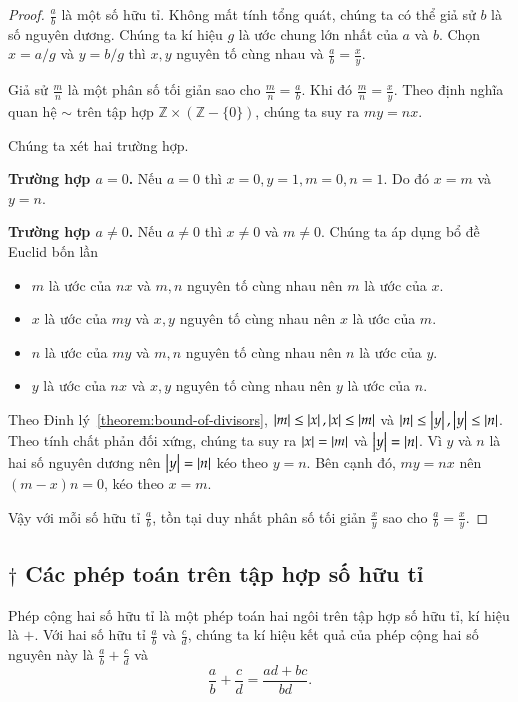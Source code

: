 \begin{proof}
	$\frac{a}{b}$ là một số hữu tỉ. Không mất tính tổng quát, chúng ta có thể giả sử $b$ là số nguyên dương. Chúng ta kí hiệu $g$ là ước chung lớn nhất của $a$ và $b$. Chọn $x = a/g$ và $y = b/g$ thì $x, y$ nguyên tố cùng nhau và $\frac{a}{b} = \frac{x}{y}$.

	Giả sử $\frac{m}{n}$ là một phân số tối giản sao cho $\frac{m}{n} = \frac{a}{b}$. Khi đó $\frac{m}{n} = \frac{x}{y}$. Theo định nghĩa quan hệ $\sim$ trên tập hợp $\mathbb{Z}\times (\mathbb{Z} - \{0\})$, chúng ta suy ra $m y = n x$.

	Chúng ta xét hai trường hợp.

	\textbf{Trường hợp $a = 0$.} Nếu $a = 0$ thì $x = 0, y = 1, m = 0, n = 1$. Do đó $x = m$ và $y = n$.

	\textbf{Trường hợp $a\ne 0$.} Nếu $a\ne 0$ thì $x\ne 0$ và $m\ne 0$. Chúng ta áp dụng bổ đề Euclid bốn lần
	\begin{itemize}
		\item $m$ là ước của $n x$ và $m, n$ nguyên tố cùng nhau nên $m$ là ước của $x$.
		\item $x$ là ước của $m y$ và $x, y$ nguyên tố cùng nhau nên $x$ là ước của $m$.
		\item $n$ là ước của $m y$ và $m, n$ nguyên tố cùng nhau nên $n$ là ước của $y$.
		\item $y$ là ước của $n x$ và $x, y$ nguyên tố cùng nhau nên $y$ là ước của $n$.
	\end{itemize}

	Theo Đinh lý~\ref{theorem:bound-of-divisors}, $\left\vert{m}\right\vert \leq \left\vert{x}\right\vert, \left\vert{x}\right\vert \leq \left\vert{m}\right\vert$ và $\left\vert{n}\right\vert \leq \left\vert{y}\right\vert, \left\vert{y}\right\vert \leq \left\vert{n}\right\vert$. Theo tính chất phản đối xứng, chúng ta suy ra $\left\vert{x}\right\vert = \left\vert{m}\right\vert$ và $\left\vert{y}\right\vert = \left\vert{n}\right\vert$. Vì $y$ và $n$ là hai số nguyên dương nên $\left\vert{y}\right\vert = \left\vert{n}\right\vert$ kéo theo $y = n$. Bên cạnh đó, $m y = n x$ nên $(m - x) n = 0$, kéo theo $x = m$.

	Vậy với mỗi số hữu tỉ $\frac{a}{b}$, tồn tại duy nhất phân số tối giản $\frac{x}{y}$ sao cho $\frac{a}{b} = \frac{x}{y}$.
\end{proof}

\subsection*{$\dagger$ Các phép toán trên tập hợp số hữu tỉ}

\begin{definition}
	Phép cộng hai số hữu tỉ là một phép toán hai ngôi trên tập hợp số hữu tỉ, kí hiệu là $+$. Với hai số hữu tỉ $\frac{a}{b}$ và $\frac{c}{d}$, chúng ta kí hiệu kết quả của phép cộng hai số nguyên này là $\frac{a}{b} + \frac{c}{d}$ và
	\[
		\frac{a}{b} + \frac{c}{d} = \frac{a d + b c}{b d}.
	\]
\end{definition}

